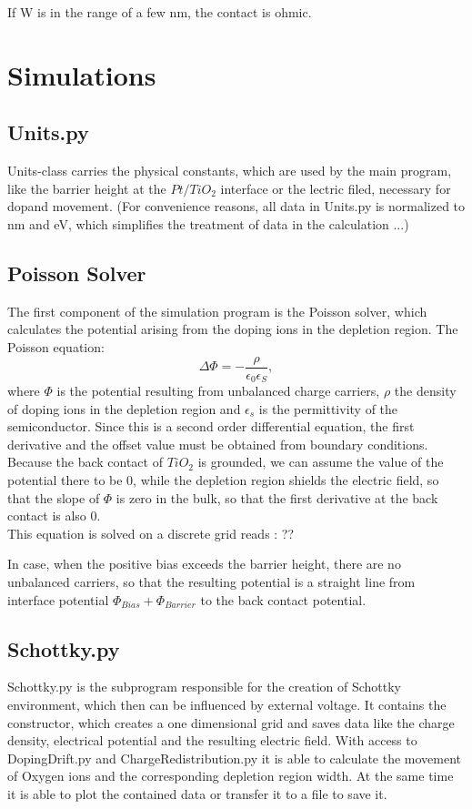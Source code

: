 \documentclass[12pt]{article}
\begin{document}
If W is in the range of a few nm, the contact is ohmic.



\section{Simulations}
	\label{sec:Simulations}

\subsection{Units.py}
	Units-class carries the physical constants, which are used by the main program, like the barrier height at the $Pt/TiO_2$ interface or the lectric filed, necessary for dopand movement. (For convenience reasons, all data in Units.py is normalized to nm and eV, which simplifies the treatment of data in the calculation ...)

\subsection{Poisson Solver}
	The first component of the simulation program is the Poisson solver, which calculates the potential arising from the doping ions in the depletion region. The Poisson equation:
	\begin{equation}
	\Delta\Phi = - \frac{\rho}{\epsilon _0\epsilon_S},
	\end{equation}
	where $\Phi$ is the potential resulting from unbalanced charge carriers, $\rho$ the density of doping ions in the depletion region and $\epsilon_s$ is the permittivity of the semiconductor. Since this is a second order differential equation, the first derivative and the offset value must be obtained from boundary conditions. Because the back contact of $TiO_2$ is grounded, we can assume the value of the potential there to be 0, while the depletion region shields the electric field, so that the slope of $\Phi$ is zero in the bulk, so that the first derivative at the back contact is also 0. \\
	This equation is solved on a discrete grid reads : ??
	
	In case, when the positive bias exceeds the barrier height, there are no unbalanced carriers, so that the resulting potential is a straight line from interface potential \( \Phi_{Bias} + \Phi_{Barrier} \) to the back contact potential.
	
	\subsection{Schottky.py}
	Schottky.py is the subprogram responsible for the creation of Schottky environment, which then can be influenced by external voltage.
	It contains the constructor, which creates a one dimensional grid and saves data like the charge density, electrical potential and the resulting electric field. With access to DopingDrift.py and ChargeRedistribution.py it is able to calculate the movement of Oxygen ions and the corresponding depletion region width. At the same time it is able to plot the contained data or transfer it to a file to save it.
\end{document}
